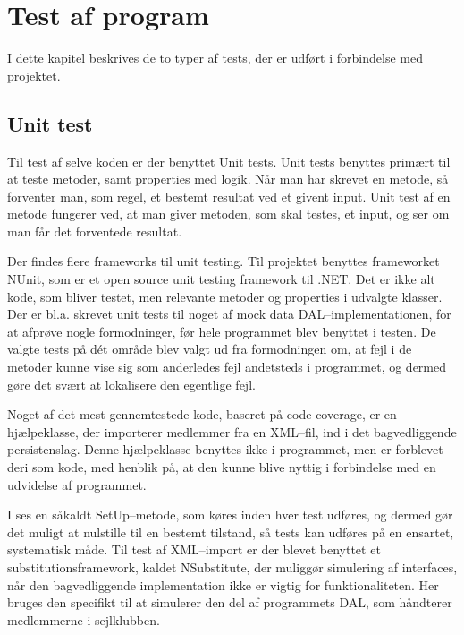 \chapter{Test af program}\label{test_af_program}
I dette kapitel beskrives de to typer af tests, der er udført i forbindelse med projektet. 

\section{Unit test}
Til test af selve koden er der benyttet Unit tests.
Unit tests benyttes primært til at teste metoder, samt properties med logik.
Når man har skrevet en metode, så forventer man, som regel, et bestemt resultat ved et givent input.
Unit test af en metode fungerer ved, at man giver metoden, som skal testes, et input, og ser om man får det forventede resultat.

Der findes flere frameworks til unit testing.
Til projektet benyttes frameworket NUnit, som er et open source unit testing framework til .NET.
Det er ikke alt kode, som bliver testet, men relevante metoder og properties i udvalgte klasser.
Der er bl.a. skrevet unit tests til noget af mock data \ac{DAL}--implementationen, for at afprøve nogle formodninger, før hele programmet blev benyttet i testen.
De valgte tests på dét område blev valgt ud fra formodningen om, at fejl i de metoder kunne vise sig som anderledes fejl andetsteds i programmet, og dermed gøre det svært at lokalisere den egentlige fejl.

Noget af det mest gennemtestede kode, baseret på code coverage, er en hjælpeklasse, der importerer medlemmer fra en XML--fil, ind i det bagvedliggende persistenslag.
Denne hjælpeklasse benyttes ikke i programmet, men er forblevet deri som kode, med henblik på, at den kunne blive nyttig i forbindelse med en udvidelse af programmet.

I  ses en såkaldt SetUp--metode, som køres inden hver test udføres, og dermed gør det muligt at nulstille til en bestemt tilstand, så tests kan udføres på en ensartet, systematisk måde.
Til test af XML--import er der blevet benyttet et substitutionsframework, kaldet NSubstitute, der muliggør simulering af interfaces, når den bagvedliggende implementation ikke er vigtig for funktionaliteten.
Her bruges den specifikt til at simulerer den del af programmets \ac{DAL}, som håndterer medlemmerne i sejlklubben.

